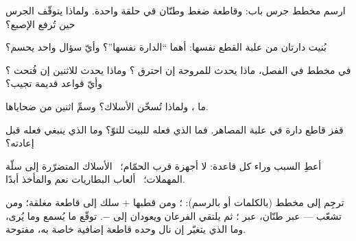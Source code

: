 \begin{exercise}[$\star$]\label{exo:g6:circuits-and-safety:3}
ارسم مخطط جرس باب:  وقاطعة ضغط وطنّان في حلقة واحدة.
ولماذا يتوقّف الجرس حين تُرفع الإصبع؟
\end{exercise}

\begin{exercise}[$\star$]\label{exo:g6:circuits-and-safety:4}
بُنيت دارتان من علبة القطع نفسها: أهما ``الدارة نفسها''؟ وأيّ
سؤال واحد يحسم؟
\end{exercise}

\begin{exercise}[$\star$]\label{exo:g6:circuits-and-safety:5}
في مخطط   في الفصل، ماذا يحدث للمروحة إن احترق
؟ وماذا يحدث للاثنين إن فُتحت ؟ وأيّ قواعد قديمة
تجيب؟
\end{exercise}

\begin{exercise}[$\star$]\label{exo:g6:circuits-and-safety:6}
ما ، ولماذا تُسخّن الأسلاك؟ وسمِّ اثنين من
ضحاياها.
\end{exercise}

\begin{exercise}[$\star$]\label{exo:g6:circuits-and-safety:7}
قفز قاطع دارة في علبة المصاهر. فما الذي فعله للبيت للتوّ؟ وما
الذي ينبغي فعله قبل إعادته؟
\end{exercise}

\begin{exercise}[$\star$]\label{exo:g6:circuits-and-safety:8}
أعطِ السبب وراء كل قاعدة: لا أجهزة قرب الحمّام؛ \ الأسلاك
المتضرّرة إلى سلّة المهملات؛ \ ألعاب البطاريات نعم والمأخذ
أبدًا.
\end{exercise}

\begin{exercise}[$\star\star$]\label{exo:g6:circuits-and-safety:9}
ترجِم إلى مخطط (بالكلمات أو بالرسم): ؛ ومن قطبها $+$ سلك
إلى قاطعة مغلقة؛ ومن  تشعّب ---  عبر طنّان،  عبر
؛ ثم يلتقي الفرعان ويعودان إلى $-$. توقّع ما يُسمع وما
يُرى، وما الذي يتغيّر إن نال   وحده قاطعة إضافية
خاصة به، مفتوحة.
\end{exercise}


